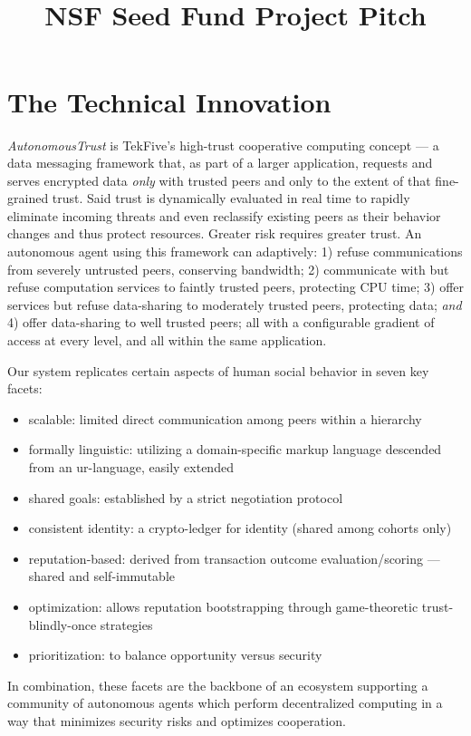 \documentclass[10pt, twoside]{article}
\title{\textbf{\huge \projectName}\\ NSF Seed Fund Project Pitch}
\date{\monthname{} \the\year}
\newcommand{\projectName}{\emph{AutonomousTrust }}
\begin{document}
	
\TekFiveTitle

\section{The Technical Innovation}

\projectName is TekFive's high-trust cooperative computing concept --- a data messaging framework that, as part of a larger application, requests and serves encrypted data \textit{only} with trusted peers and only to the extent of that fine-grained trust. Said trust is dynamically evaluated in real time to rapidly eliminate incoming threats and even reclassify existing peers as their behavior changes and thus protect resources. Greater risk requires greater trust. An autonomous agent using this framework can adaptively: 1) refuse communications from severely untrusted peers, conserving bandwidth; 2) communicate with but refuse computation services to faintly trusted peers, protecting CPU time; 3) offer services but refuse data-sharing to moderately trusted peers, protecting data; \textit{and} 4) offer data-sharing to well trusted peers; all with a configurable gradient of access at every level, and all within the same application.

Our system replicates certain aspects of human social behavior in seven key facets:
\begin{itemize}
	\item scalable: limited direct communication among peers within a hierarchy
	\item formally linguistic: utilizing a domain-specific markup language descended from an ur-language, easily extended
	\item shared goals: established by a strict negotiation protocol
	\item consistent identity: a crypto-ledger for identity (shared among cohorts only)
	\item reputation-based: derived from transaction outcome evaluation/scoring --- shared and self-immutable
	\item optimization: allows reputation bootstrapping through game-theoretic trust-blindly-once strategies
	\item prioritization: to balance opportunity versus security
\end{itemize}
In combination, these facets are the backbone of an ecosystem supporting a community of autonomous agents which perform decentralized computing in a way that minimizes security risks and optimizes cooperation.
\end{document}
